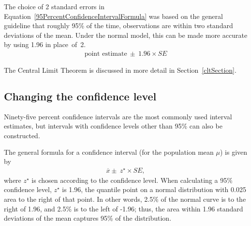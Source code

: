 \begin{spacing}{1.5}

The choice of 2 standard errors in Equation~\ref{95PercentConfidenceIntervalFormula} was based on the general guideline that roughly 95\% of the time, observations are within two standard deviations of the mean. Under the normal model, this can be made more accurate by using 1.96 in place~of~2.
\begin{align}
\text{point estimate}\ \pm\ 1.96\times SE
\label{95PercentCIWhenUsingNormalModel}
\end{align}

The Central Limit Theorem is discussed in more detail in Section~\ref{cltSection}.

\subsection{Changing the confidence level}
\label{changingTheConfidenceLevelSection}





Ninety-five percent confidence intervals are the most commonly used interval estimates, but intervals with confidence levels other than 95\% can also be constructed.

The general formula for a confidence interval (for the population mean $\mu$) is given by 
\begin{align}
	\overline{x} \pm \ z^{\star} \times SE,
\end{align}
where $z^{\star}$ is chosen according to the confidence level. When calculating a 95\% confidence level, $z^{\star}$ is 1.96, the quantile point on a normal distribution with 0.025 area to the right of that point. In other words, 2.5\% of the normal curve is to the right of 1.96, and 2.5\% is to the left of -1.96; thus, the area within 1.96 standard deviations of the mean captures 95\% of the distribution.


\end{spacing}
